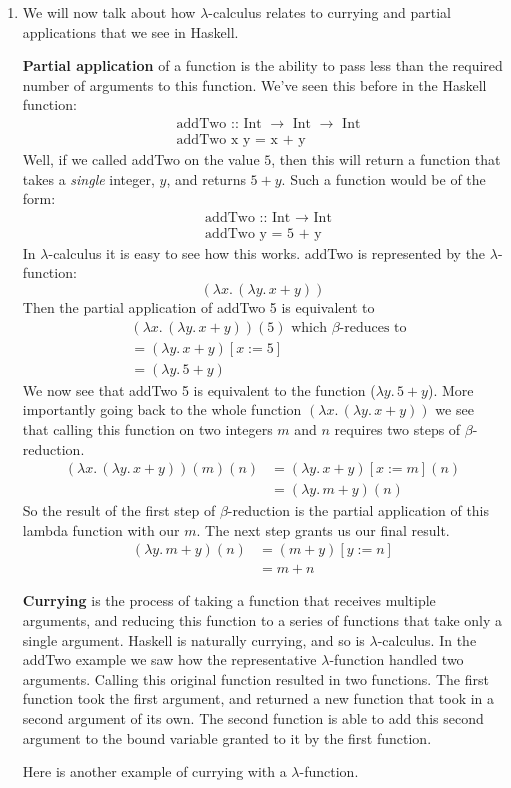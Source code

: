 \documentclass[12pt]{article}
\begin{document}
\begin{enumerate}
\item We will now talk about how $\lambda$-calculus relates to currying and partial applications that we see in Haskell.
\par \textbf{Partial application} of a function is the ability to pass less than the required number of arguments to this function. We've seen this before in the Haskell function:
\begin{align*}
	&\text{addTwo :: Int $\rightarrow$ Int $\rightarrow$ Int}\\
	&\text{addTwo x y = x + y}
\end{align*}
Well, if we called addTwo on the value $5$, then this will return a function that takes a \textit{single} integer, $y$, and returns $5 + y$. Such a function would be of the form:
\begin{align*}
	&\text{addTwo :: Int $\rightarrow$ Int}\\
	&\text{addTwo y = 5 + y}
\end{align*}
In $\lambda$-calculus it is easy to see how this works. addTwo is represented by the $\lambda$-function: $$(\lambda x.\,(\lambda y.\,x+y))$$ Then the partial application of addTwo 5 is equivalent to
\begin{align*}
&(\lambda x.\,(\lambda y.\,x+y))(5)\text{ which } \beta\text{-reduces to}\\
	&= (\lambda y. \, x + y)[x:=5]\\
	&= (\lambda y. \, 5 + y)
\end{align*}
We now see that addTwo 5 is equivalent to the function ($\lambda y. \, 5 + y$). More importantly going back to the whole function $(\lambda x.\,(\lambda y.\,x+y))$ we see that calling this function on two integers $m$ and $n$ requires two steps of $\beta$-reduction. \begin{align*}
(\lambda x.\,(\lambda y.\,x+y))(m)(n) &= (\lambda y. \, x + y)[x:=m](n)\\
	&= (\lambda y. \, m + y)(n)
\end{align*}
So the result of the first step of $\beta$-reduction is the partial application of this lambda function with our $m$. The next step grants us our final result. 
\begin{align*}
(\lambda y.\,m+y)(n)	&= (m + y)[y:=n]\\
	&= m + n
\end{align*}
\par
\textbf{Currying} is the process of taking a function that receives multiple arguments, and reducing this function to a series of functions that take only a single argument. Haskell is naturally currying, and so is $\lambda$-calculus. In the addTwo example we saw how the representative $\lambda$-function handled two arguments. Calling this original function resulted in two functions. The first function took the first argument, and returned a new function that took in a second argument of its own. The second function is able to add this second argument to the bound variable granted to it by the first function. \par Here is another example of currying with a $\lambda$-function.

\end{enumerate}
\end{document}
